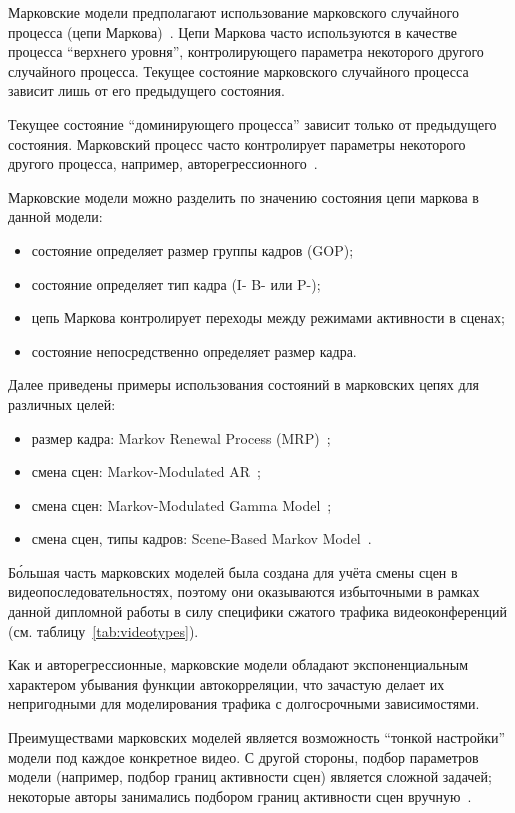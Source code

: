 Марковские модели предполагают использование марковского
случайного процесса (цепи Маркова)~\cite{markovchains}.
Цепи Маркова часто используются в качестве процесса
``верхнего уровня'', контролирующего параметра некоторого
другого случайного процесса.
Текущее состояние марковского случайного процесса зависит
лишь от его предыдущего состояния.

Текущее состояние ``доминирующего процесса'' зависит
только от предыдущего состояния. Марковский процесс
часто контролирует параметры некоторого другого процесса,
например, авторегрессионного~\cite{mmar}.

Марковские модели можно разделить по значению состояния цепи
маркова в данной модели:

\begin{itemize}
    \item состояние определяет размер группы кадров (GOP);
    \item состояние определяет тип кадра (I- B- или P-);
    \item цепь Маркова контролирует переходы между режимами
        активности в сценах;
    \item состояние непосредственно определяет размер кадра.
\end{itemize}
\hspace{3pt}


Далее приведены примеры использования состояний в марковских
цепях для различных целей:
\begin{itemize}
    \item размер кадра: Markov Renewal Process (MRP)~\cite{heymanATM};
    \item смена сцен: Markov-Modulated AR~\cite{mmar};
    \item смена сцен: Markov-Modulated Gamma Model~\cite{mmg};
    \item смена сцен, типы кадров: Scene-Based Markov Model~\cite{scenemm}.
\end{itemize}

Б\'{о}льшая часть марковских моделей была создана для учёта
смены сцен в видеопоследовательностях, поэтому они оказываются
избыточными в рамках данной дипломной работы в силу специфики
сжатого трафика видеоконференций (см. таблицу~\ref{tab:videotypes}).

Как и авторегрессионные, марковские модели обладают экспоненциальным
характером убывания функции автокорреляции, что зачастую
делает их непригодными для моделирования трафика с долгосрочными
зависимостями.

Преимуществами марковских моделей является возможность
``тонкой настройки'' модели под каждое конкретное видео.
С другой стороны, подбор параметров модели (например,
подбор границ активности сцен) является сложной задачей;
некоторые авторы занимались подбором границ активности
сцен вручную~\cite{mmar}.

